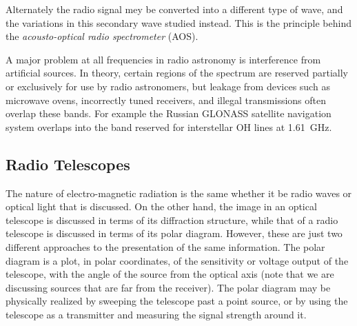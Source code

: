 \documentclass{article}
\begin{document}
Alternately the radio signal mey be converted into a different type of
wave, and the variations in this secondary wave studied instead. This
is the principle behind the {\it acousto-optical radio spectrometer} (AOS).

A major problem at all frequencies in radio astronomy is interference from
artificial sources. In theory, certain regions of the spectrum are reserved
partially or exclusively for use by radio astronomers, but leakage from
devices such as microwave ovens, incorrectly tuned receivers, and illegal 
transmissions often overlap these bands. For example the Russian GLONASS
satellite navigation system overlaps into the band reserved for interstellar
OH lines at 1.61~GHz.

\subsection{Radio Telescopes}

The nature of electro-magnetic radiation is the same whether it be radio waves
or optical light that is discussed. On the other hand, the image in an optical 
telescope is discussed in terms of its diffraction structure, while that of 
a radio telescope is discussed in terms of its polar diagram. However, these 
are just two different approaches to the presentation of the same information.
The polar diagram is a plot, in polar coordinates, of the sensitivity or 
voltage output of the telescope, with the angle of the source from the
optical axis (note that we are discussing sources that are far from the 
receiver). The polar diagram may be physically realized by sweeping the 
telescope past a point source, or by using the telescope as a transmitter
and measuring the signal strength around it.
\end{document}
